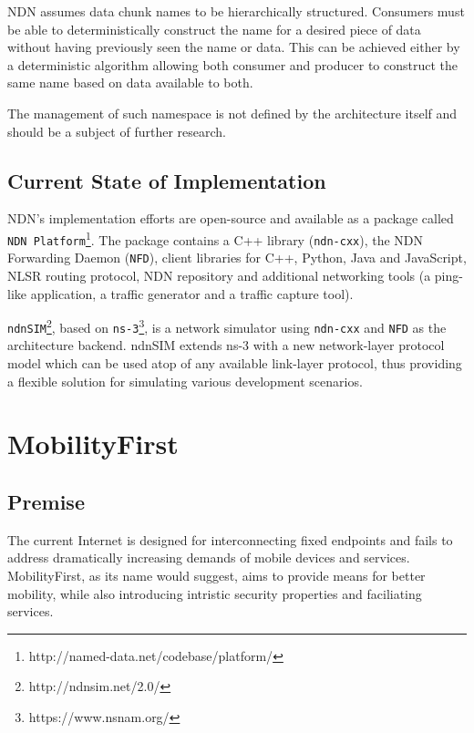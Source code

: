                 NDN assumes data chunk names to be hierarchically structured. Consumers must be able to deterministically construct the name for a desired piece of data without having previously seen the name or data. This can be achieved either by a deterministic algorithm allowing both consumer and producer to construct the same name based on data available to both.

                The management of such namespace is not defined by the architecture itself and should be a subject of further research.

        \subsection{Current State of Implementation}

            NDN's implementation efforts are open-source and available as a package called \texttt{NDN Platform}\footnote{http://named-data.net/codebase/platform/}. The package contains a C++ library (\texttt{ndn-cxx}), the NDN Forwarding Daemon (\texttt{NFD}), client libraries for C++, Python, Java and JavaScript, NLSR routing protocol, NDN repository and additional networking tools (a ping-like application, a traffic generator and a traffic capture tool).

            \texttt{ndnSIM}\footnote{http://ndnsim.net/2.0/}, based on \texttt{ns-3}\footnote{https://www.nsnam.org/}, is a network simulator using \texttt{ndn-cxx} and \texttt{NFD} as the architecture backend. ndnSIM extends ns-3 with a new network-layer protocol model which can be used atop of any available link-layer protocol, thus providing a flexible solution for simulating various development scenarios.


    \section{MobilityFirst}\label{archs:mf}

        \subsection{Premise}

            The current Internet is designed for interconnecting fixed endpoints and fails to address dramatically increasing demands of mobile devices and services. MobilityFirst, as its name would suggest, aims to provide means for better mobility, while also introducing intristic security properties and faciliating services.

